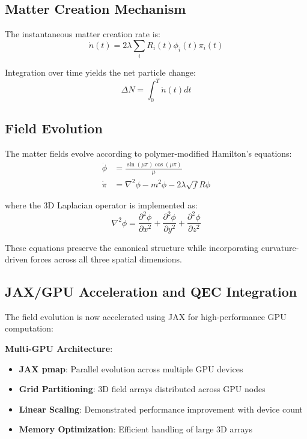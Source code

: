 \documentclass[11pt]{article}
\begin{document}
\subsection{Matter Creation Mechanism}

The instantaneous matter creation rate is:
\begin{equation}
\dot{n}(t) = 2\lambda \sum_i R_i(t) \phi_i(t) \pi_i(t)
\end{equation}

Integration over time yields the net particle change:
\begin{equation}
\Delta N = \int_0^T \dot{n}(t) dt
\end{equation}

\subsection{Field Evolution}

The matter fields evolve according to polymer-modified Hamilton's equations:
\begin{align}
\dot{\phi} &= \frac{\sin(\mu\pi)\cos(\mu\pi)}{\mu} \\
\dot{\pi} &= \nabla^2\phi - m^2\phi - 2\lambda\sqrt{f}R\phi
\end{align}

where the 3D Laplacian operator is implemented as:
\begin{equation}
\nabla^2\phi = \frac{\partial^2\phi}{\partial x^2} + \frac{\partial^2\phi}{\partial y^2} + \frac{\partial^2\phi}{\partial z^2}
\end{equation}

These equations preserve the canonical structure while incorporating curvature-driven forces across all three spatial dimensions.

\subsection{JAX/GPU Acceleration and QEC Integration}

The field evolution is now accelerated using JAX for high-performance GPU computation:

\textbf{Multi-GPU Architecture}:
\begin{itemize}
\item \textbf{JAX pmap}: Parallel evolution across multiple GPU devices
\item \textbf{Grid Partitioning}: 3D field arrays distributed across GPU nodes
\item \textbf{Linear Scaling}: Demonstrated performance improvement with device count
\item \textbf{Memory Optimization}: Efficient handling of large 3D arrays
\end{itemize}
\end{document}

